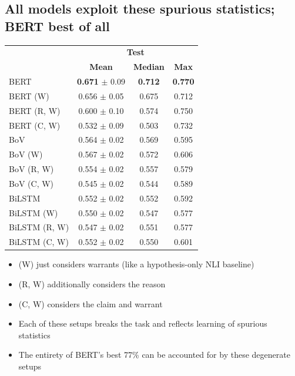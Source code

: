 \documentclass[a0,portrait]{a0poster}
\begin{document}
\begin{multicols}{2}
\section*{All models exploit these spurious statistics; BERT best of all}

\begin{center}
\small
\begin{tabular}{|l|ccc|}
\hline
\multirow{2}{*}{} & \multicolumn{3}{c|}{\textbf{Test}} \\
& \textbf{Mean} & \textbf{Median} & \textbf{Max} \\
\hline
BERT & \textbf{0.671} $\pm$ 0.09 & \textbf{0.712} & \textbf{0.770} \\
BERT (W) & 0.656 $\pm$ 0.05 & 0.675 & 0.712 \\
BERT (R, W) & 0.600 $\pm$ 0.10 & 0.574 & 0.750 \\
BERT (C, W) & 0.532 $\pm$ 0.09 & 0.503 & 0.732 \\
\hline
BoV & 0.564 $\pm$ 0.02 & 0.569 & 0.595 \\
BoV (W) & 0.567 $\pm$ 0.02 & 0.572 & 0.606 \\
BoV (R, W) & 0.554 $\pm$ 0.02 & 0.557 & 0.579 \\
BoV (C, W) & 0.545 $\pm$ 0.02 & 0.544 & 0.589 \\
\hline
BiLSTM & 0.552 $\pm$ 0.02 & 0.552 & 0.592 \\
BiLSTM (W) & 0.550 $\pm$ 0.02 & 0.547 & 0.577 \\
BiLSTM (R, W) & 0.547 $\pm$ 0.02 & 0.551 & 0.577 \\
BiLSTM (C, W) & 0.552 $\pm$ 0.02 & 0.550 & 0.601 \\
\hline
\end{tabular}
\end{center}

\vspace{8pt}

\begin{itemize}
    \item (W) just considers warrants (like a hypothesis-only NLI baseline)
    \item (R, W) additionally considers the reason
    \item (C, W) considers the claim and warrant
    \item Each of these setups breaks the task and reflects learning of spurious statistics
    \item The entirety of BERT's best 77\% can be accounted for by these degenerate setups
\end{itemize}


\end{multicols}
\end{document}
